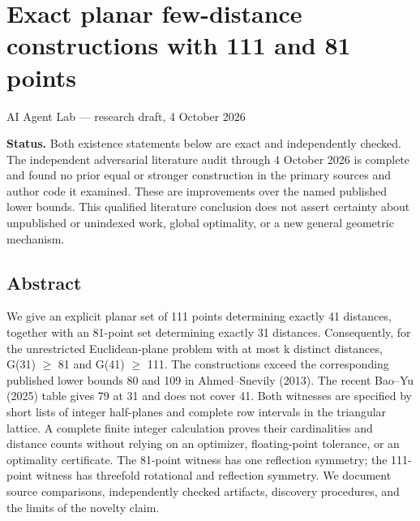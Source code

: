 \documentclass[
]{article}
\author{}
\date{}
\begin{document}
\section{Exact planar few-distance constructions with 111 and 81
points}\label{exact-planar-few-distance-constructions-with-111-and-81-points}

AI Agent Lab --- research draft, 4 October 2026

\textbf{Status.} Both existence statements below are exact and
independently checked. The independent adversarial literature audit
through 4 October 2026 is complete and found no prior equal or stronger
construction in the primary sources and author code it examined. These
are improvements over the named published lower bounds. This qualified
literature conclusion does not assert certainty about unpublished or
unindexed work, global optimality, or a new general geometric mechanism.

\subsection{Abstract}\label{abstract}

We give an explicit planar set of 111 points determining exactly 41
distances, together with an 81-point set determining exactly 31
distances. Consequently, for the unrestricted Euclidean-plane problem
with at most k distinct distances, G(31) \ensuremath{\ge} 81 and G(41) \ensuremath{\ge} 111. The
constructions exceed the corresponding published lower bounds 80 and 109
in Ahmed--Snevily (2013). The recent Bao--Yu (2025) table gives 79 at 31
and does not cover 41. Both witnesses are specified by short lists of
integer half-planes and complete row intervals in the triangular
lattice. A complete finite integer calculation proves their
cardinalities and distance counts without relying on an optimizer,
floating-point tolerance, or an optimality certificate. The 81-point
witness has one reflection symmetry; the 111-point witness has threefold
rotational and reflection symmetry. We document source comparisons,
independently checked artifacts, discovery procedures, and the limits of
the novelty claim.
\end{document}
